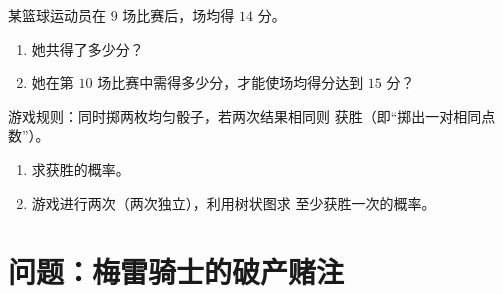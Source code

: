 \begin{exercise}[$\star\star$]\label{exo:g9:statproba:8}
某篮球运动员在 $9$ 场比赛后，场均得 $14$ 分。
\begin{enumerate}
  \item 她共得了多少分？
  \item 她在第 $10$ 场比赛中需得多少分，才能使场均得分达到
        $15$ 分？
\end{enumerate}
\end{exercise}

\begin{exercise}[$\star\star\star$]\label{exo:g9:statproba:9}
游戏规则：同时掷两枚均匀骰子，若两次结果相同则
获胜（即“掷出一对相同点数”）。
\begin{enumerate}
  \item 求获胜的概率。
  \item 游戏进行两次（两次独立），利用树状图求
        至少获胜一次的概率。
\end{enumerate}
\end{exercise}

\section{问题：梅雷骑士的破产赌注}

